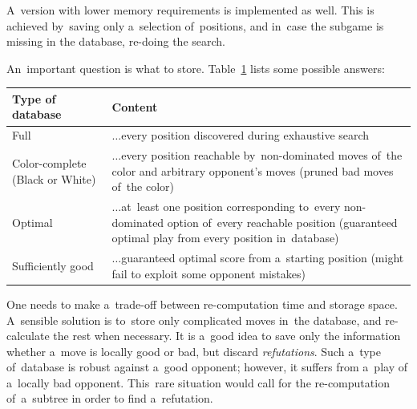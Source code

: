 A~version with lower memory requirements is implemented as well.
This is achieved by~saving only a~selection of~positions, and in~case the subgame is missing in the database, re-doing the search.

An~important question is what to store.
Table~\ref{tab:db-loc-games} lists some possible answers:
\begin{table}[!htbp]
  \centering
  \begin{tabular}{ |p{}|p{}| } 
    \hline
    \textbf{Type of database} & \textbf{Content} \\
    \hline
    Full                            & $\dots$every position discovered during exhaustive search \\
    Color-complete (Black or White) & $\dots$every position reachable by~non-dominated moves of~the color and arbitrary opponent's moves (pruned bad moves of~the color) \\
    Optimal                         & $\dots$at~least one position corresponding to~every non-dominated option of~every reachable position (guaranteed optimal play from every position in~database) \\
    Sufficiently good               & $\dots$guaranteed optimal score from a~starting position (might fail to exploit some opponent mistakes) \\
    \hline
  \end{tabular}
  \label{tab:db-loc-games}
\end{table}

One needs to make a~trade-off between re-computation time and storage space.
A~sensible solution is to~store only complicated moves in~the database, and re-calculate the rest when necessary.
It is a~good idea to save only the information whether a~move is locally good or bad, but discard \emph{refutations}\footnotemark.
Such a~type of~database is robust against a~good opponent;
however, it suffers from a~play of a~locally bad opponent.
This~rare situation would call for the re-computation of~a~subtree in order to find a~refutation.

